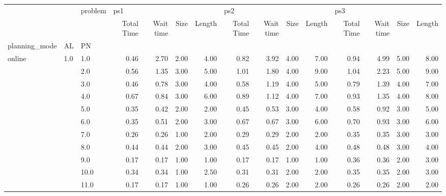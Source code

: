 \begin{tabular}{lllrrrrrrrrrrrr}
\toprule
       &     & problem & \multicolumn{4}{l}{ps1} & \multicolumn{4}{l}{ps2} & \multicolumn{4}{l}{ps3} \\
       &     & {} & Total Time & Wait time & Size & Length & Total Time & Wait time & Size & Length & Total Time & Wait time & Size & Length \\
planning\_mode & AL & PN &            &           &      &        &            &           &      &        &            &           &      &        \\
\midrule
online & 1.0 & 1.0  &       0.46 &      2.70 & 2.00 &   4.00 &       0.82 &      3.92 & 4.00 &   7.00 &       0.94 &      4.99 & 5.00 &   8.00 \\
       &     & 2.0  &       0.56 &      1.35 & 3.00 &   5.00 &       1.01 &      1.80 & 4.00 &   9.00 &       1.04 &      2.23 & 5.00 &   9.00 \\
       &     & 3.0  &       0.46 &      0.78 & 3.00 &   4.00 &       0.58 &      1.19 & 4.00 &   5.00 &       0.79 &      1.39 & 4.00 &   7.00 \\
       &     & 4.0  &       0.67 &      0.84 & 3.00 &   6.00 &       0.89 &      1.12 & 4.00 &   7.00 &       0.93 &      1.35 & 4.00 &   8.00 \\
       &     & 5.0  &       0.35 &      0.42 & 2.00 &   2.00 &       0.45 &      0.53 & 3.00 &   4.00 &       0.58 &      0.92 & 3.00 &   5.00 \\
       &     & 6.0  &       0.35 &      0.51 & 2.00 &   3.00 &       0.67 &      0.67 & 3.00 &   6.00 &       0.70 &      0.93 & 3.00 &   6.00 \\
       &     & 7.0  &       0.26 &      0.26 & 1.00 &   2.00 &       0.29 &      0.29 & 2.00 &   2.00 &       0.35 &      0.35 & 3.00 &   3.00 \\
       &     & 8.0  &       0.44 &      0.44 & 2.00 &   3.00 &       0.45 &      0.45 & 2.00 &   4.00 &       0.48 &      0.48 & 3.00 &   4.00 \\
       &     & 9.0  &       0.17 &      0.17 & 1.00 &   1.00 &       0.17 &      0.17 & 1.00 &   1.00 &       0.36 &      0.36 & 2.00 &   3.00 \\
       &     & 10.0 &       0.34 &      0.34 & 1.00 &   2.50 &       0.31 &      0.31 & 2.00 &   2.00 &       0.35 &      0.35 & 2.00 &   3.00 \\
       &     & 11.0 &       0.17 &      0.17 & 1.00 &   1.00 &       0.26 &      0.26 & 2.00 &   2.00 &       0.26 &      0.26 & 2.00 &   2.00 \\

\end{tabular}
